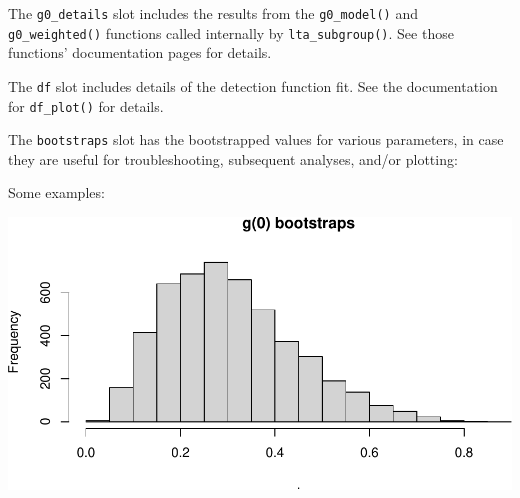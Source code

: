 \documentclass[
]{book}
\newenvironment{Shaded}{\begin{snugshade}}{\end{snugshade}}
\newcommand{\DecValTok}[1]{\textcolor[rgb]{0.00,0.00,0.81}{#1}}
\newcommand{\NormalTok}[1]{#1}
\newcommand{\OperatorTok}[1]{\textcolor[rgb]{0.81,0.36,0.00}{\textbf{#1}}}
\newcommand{\StringTok}[1]{\textcolor[rgb]{0.31,0.60,0.02}{#1}}
\begin{document}
The \texttt{g0\_details} slot includes the results from the \texttt{g0\_model()} and \texttt{g0\_weighted()} functions called internally by \texttt{lta\_subgroup()}. See those functions' documentation pages for details.

\begin{Shaded}
\end{Shaded}

The \texttt{df} slot includes details of the detection function fit. See the documentation for \texttt{df\_plot()} for details.

\begin{Shaded}
\end{Shaded}

The \texttt{bootstraps} slot has the bootstrapped values for various parameters, in case they are useful for troubleshooting, subsequent analyses, and/or plotting:

\begin{Shaded}
\end{Shaded}

Some examples:

\includegraphics{figures/unnamed-chunk-245-1.pdf}
\end{document}
